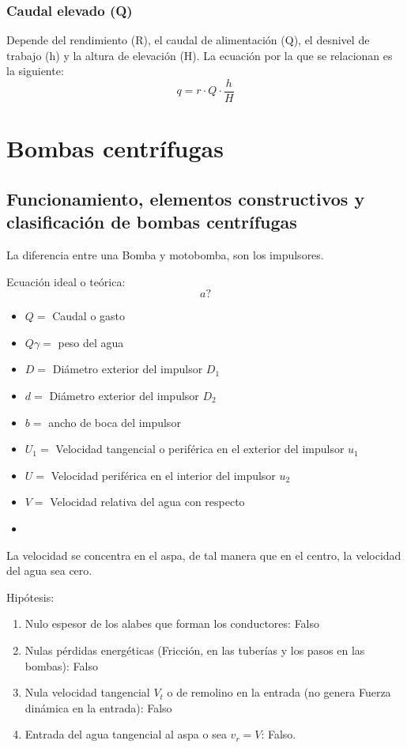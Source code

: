 \subsubsection{Caudal elevado (Q)}
Depende del rendimiento (R), el caudal de alimentación (Q), el desnivel de trabajo (h) y la altura de elevación (H). La ecuación por la que se relacionan es la siguiente:
\begin{equation}
  q = r \cdot Q \cdot \frac{h}{H}
\end{equation}


\section{Bombas centrífugas}
\subsection{Funcionamiento, elementos constructivos y clasificación de bombas centrífugas}
La diferencia entre una Bomba y motobomba, son los impulsores.

Ecuación ideal o teórica:
\begin{equation}
    a?
\end{equation}
\begin{notation}
    \begin{itemize}
        \item $Q=$ Caudal o gasto
        \item $Q\gamma=$ peso del agua
        \item $D=$ Diámetro exterior del impulsor $D_1$
        \item $d=$ Diámetro exterior del impulsor $D_2$
        \item $b=$ ancho de boca del impulsor
        \item $U_1=$ Velocidad tangencial o periférica en el exterior del impulsor $u_1$
        \item $U=$ Velocidad periférica en el interior del impulsor $u_2$
        \item $V=$ Velocidad relativa del agua con respecto
        \item 
    \end{itemize}
\end{notation}
La velocidad se concentra en el aspa, de tal manera que en el centro, la velocidad del agua sea cero.

Hipótesis:
\begin{enumerate}
    \item Nulo espesor de los alabes que forman los conductores: Falso
    \item Nulas pérdidas energéticas (Fricción, en las tuberías y los pasos en las bombas): Falso
    \item Nula velocidad tangencial $V_t$ o de remolino en la entrada (no genera Fuerza dinámica en la entrada): Falso
    \item Entrada del agua tangencial al aspa o sea $v_r=V$: Falso.
\end{enumerate}

